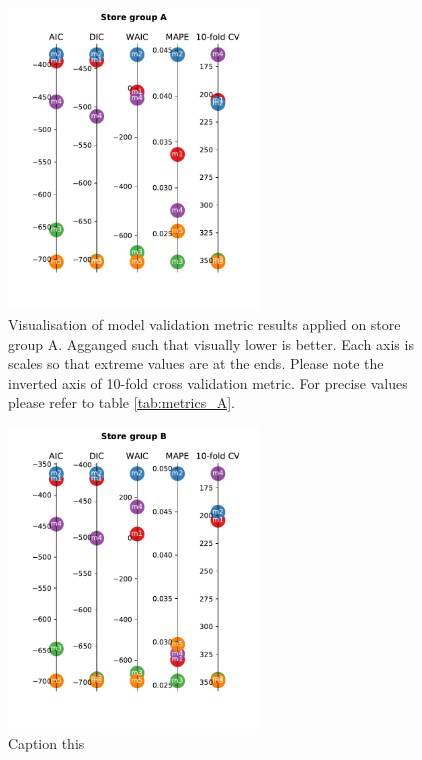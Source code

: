 \documentclass[english, 12pt, a4paper, sci, utf8, a-1b, online]{aaltothesis}
\begin{document}
\begin{figure}[htb]
	\centering
	\includegraphics[height=8cm]{../plots/metrics/metrics_plot_A.pdf}
	\caption{Visualisation of model validation metric results applied on store group A. Agganged such that visually lower is better.
	Each axis is scales so that extreme values are at the ends. Please note the inverted axis of 10-fold cross validation metric. For 
	precise values please refer to table \ref{tab:metrics_A}.
	}
	\label{fig:metrics_A}
\end{figure}

\begin{figure}[htb]
	\centering
	\includegraphics[height=8cm]{../plots/metrics/metrics_plot_B.pdf}
	\caption{Caption this}
	\label{fig:metrics_B}
\end{figure}
\end{document}
